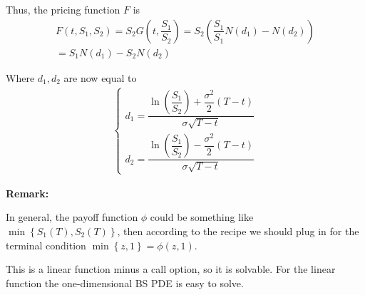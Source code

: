 \noindent Thus, the pricing function $F$ is 
\begin{equation*}
  \begin{gathered}
    F(t,S_1,S_2) = S_2G\left(t,\dfrac{S_1}{S_2}\right) = S_2\left(\dfrac{S_1}{S_1}N(d_1)-N(d_2)\right)\\
    = S_1N(d_1)-S_2N(d_2)
  \end{gathered}
\end{equation*}\par
\noindent Where $d_1,d_2$ are now equal to
\begin{equation*}
  \begin{gathered}
    \begin{cases}
      d_1 = \dfrac{\ln{\left(\dfrac{S_1}{S_2}\right)}+\dfrac{\sigma^2}{2}(T-t)}{\sigma\sqrt{T-t}}\\
      d_2 = \dfrac{\ln{\left(\dfrac{S_1}{S_2}\right)}-\dfrac{\sigma^2}{2}(T-t)}{\sigma\sqrt{T-t}}
    \end{cases}
  \end{gathered}
\end{equation*}
\par\bigskip
\noindent\textbf{Remark:}\par
\noindent In general, the payoff function $\phi$ could be something like $\min\left\{S_1(T),S_2(T)\right\}$, then according to the recipe we should plug in for the terminal condition $\min\left\{z,1\right\} = \phi(z,1)$.\par
\noindent This is a linear function minus a call option, so it is solvable. For the linear function the one-dimensional BS PDE is easy to solve.

